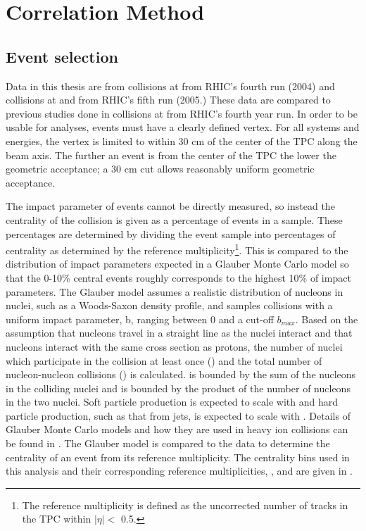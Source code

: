 \chapter{Correlation Method\label{CorrMethod}}

\section{Event selection}
Data in this thesis are from \Au collisions at \sNNsixtytwo from RHIC's fourth run (2004) and \Cu collisions at \sNNsixtytwo and \sNNtwohundred from RHIC's fifth run (2005.)  These data are compared to previous studies done in \Au collisions at \sNNtwohundred from RHIC's fourth year run.  In order to be usable for analyses, events must have a clearly defined vertex.  For all systems and energies, the vertex is limited to within 30 cm of the center of the TPC along the beam axis.  The further an event is from the center of the TPC the lower the geometric acceptance; a 30 cm cut allows reasonably uniform geometric acceptance.

The impact parameter of events cannot be directly measured, so instead the centrality of the collision is given as a percentage of events in a sample.  These percentages are determined by dividing the event sample into percentages of centrality as determined by the reference multiplicity\footnote{The reference multiplicity is defined as the uncorrected number of tracks in the TPC within $|\eta|<$ 0.5.}.  This is compared to the distribution of impact parameters expected in a Glauber Monte Carlo model \cite{Miller:2007ri} so that the 0-10\% central events roughly corresponds to the highest 10\% of impact parameters.  The Glauber model assumes a realistic distribution of nucleons in nuclei, such as a Woods-Saxon density profile, and samples collisions with a uniform impact parameter, b, ranging between 0 and a cut-off $b_{max}$.  Based on the assumption that nucleons travel in a straight line as the nuclei interact and that nucleons interact with the same cross section as protons, the number of nuclei which participate in the collision at least once (\npart) and the total number of nucleon-nucleon collisions (\nbin) is calculated.  \npart is bounded by the sum of the nucleons in the colliding nuclei and \nbin is bounded by the product of the number of nucleons in the two nuclei.  Soft particle production is expected to scale with \npart and hard particle production, such as that from jets, is expected to scale with \nbin.  Details of Glauber Monte Carlo models and how they are used in heavy ion collisions can be found in \cite{Miller:2007ri}.  The Glauber model is compared to the data to determine the centrality of an event from its reference multiplicity.  The centrality bins used in this analysis and their corresponding reference multiplicities, \nbin, and \npart are given in .

